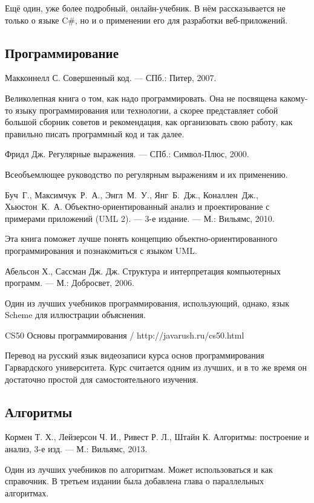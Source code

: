 \begin{thebibliography}{99}
  Ещё один, уже более подробный, онлайн-учебник. В нём рассказывается
  не только о языке C\#, но и о применении его для разработки
  веб-приложений.

  \subsection*{Программирование}

  Макконнелл С. Совершенный код. — СПб.: Питер, 2007.

  Великолепная книга о том, как надо программировать. Она не посвящена
  какому-то языку программирования или технологии, а скорее
  представляет собой большой сборник советов и рекомендация, как
  организовать свою работу, как правильно писать программный код и так
  далее.

  Фридл Дж. Регулярные выражения. — СПб.: Символ-Плюс, 2000.

  Всеобъемлющее руководство по регулярным выражениям и их применению.

  Буч~Г., Максимчук~Р.~А., Энгл~М.~У., Янг~Б.~Дж., Коналлен~Дж., Хьюстон~К.~А. Объектно-ориентированный анализ и проектирование с примерами приложений (UML 2). — 3-е издание. — М.: Вильямс, 2010.

  Эта книга поможет лучше понять концепцию объектно-ориентированного
  программирования и познакомиться с языком UML.

  Абельсон Х., Сассман Дж. Дж. Структура и интерпретация компьютерных программ. — М.: Добросвет, 2006.

  Один из лучших учебников программирования, использующий, однако,
  язык Scheme для иллюстрации объяснения.

  CS50 Основы программирования / http://javarush.ru/cs50.html

  Перевод на русский язык видеозаписи курса основ программирования
  Гарвардского университета.  Курс считается одним из лучших, и в то
  же время он достаточно простой для самостоятельного изучения.

  \subsection*{Алгоритмы}
  
  Кормен Т. Х., Лейзерсон Ч. И., Ривест Р. Л., Штайн К. Алгоритмы: построение и анализ, 3-е изд. — М.: Вильямс, 2013.
  
  Один из лучших учебников по алгоритмам. Может использоваться и как
  справочник. В третьем издании была добавлена глава о параллельных
  алгоритмах.
  

\end{thebibliography}
